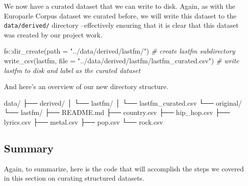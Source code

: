 \documentclass[
  letterpaper,
]{latex/krantz}
\newenvironment{Shaded}{\begin{snugshade}}{\end{snugshade}}
\newcommand{\AttributeTok}[1]{\textcolor[rgb]{0.00,0.00,0.00}{#1}}
\newcommand{\CommentTok}[1]{\textcolor[rgb]{0.00,0.00,0.00}{\textit{#1}}}
\newcommand{\ExtensionTok}[1]{\textcolor[rgb]{0.00,0.00,0.00}{#1}}
\newcommand{\FunctionTok}[1]{\textcolor[rgb]{0.00,0.00,0.00}{#1}}
\newcommand{\NormalTok}[1]{\textcolor[rgb]{0.00,0.00,0.00}{#1}}
\newcommand{\SpecialCharTok}[1]{\textcolor[rgb]{0.00,0.00,0.00}{#1}}
\newcommand{\StringTok}[1]{\textcolor[rgb]{0.00,0.00,0.00}{#1}}
\begin{document}
We now have a curated dataset that we can write to disk. Again, as with
the Europarle Corpus dataset we curated before, we will write this
dataset to the \texttt{data/derived/} directory --effectively ensuring
that it is clear that this dataset was created by our project work.

\begin{Shaded}
\begin{Highlighting}[]
\NormalTok{fs}\SpecialCharTok{::}\FunctionTok{dir\_create}\NormalTok{(}\AttributeTok{path =} \StringTok{"../data/derived/lastfm/"}\NormalTok{) }\CommentTok{\# create lastfm subdirectory}
\FunctionTok{write\_csv}\NormalTok{(lastfm, }
          \AttributeTok{file =} \StringTok{"../data/derived/lastfm/lastfm\_curated.csv"}\NormalTok{) }\CommentTok{\# write lastfm to disk and label as the curated dataset}
\end{Highlighting}
\end{Shaded}

And here's an overview of our new directory structure.

\begin{Shaded}
\begin{Highlighting}[]
\ExtensionTok{data/}
\ExtensionTok{├──}\NormalTok{ derived/}
\ExtensionTok{│}\NormalTok{   └── lastfm/}
\ExtensionTok{│}\NormalTok{       └── lastfm\_curated.csv}
\ExtensionTok{└──}\NormalTok{ original/}
    \ExtensionTok{└──}\NormalTok{ lastfm/}
        \ExtensionTok{├──}\NormalTok{ README.md}
        \ExtensionTok{├──}\NormalTok{ country.csv}
        \ExtensionTok{├──}\NormalTok{ hip\_hop.csv}
        \ExtensionTok{├──}\NormalTok{ lyrics.csv}
        \ExtensionTok{├──}\NormalTok{ metal.csv}
        \ExtensionTok{├──}\NormalTok{ pop.csv}
        \ExtensionTok{└──}\NormalTok{ rock.csv}
\end{Highlighting}
\end{Shaded}

\hypertarget{summary-7}{%
\subsection{Summary}\label{summary-7}}

Again, to summarize, here is the code that will accomplish the steps we
covered in this section on curating structured datasets.
\end{document}
